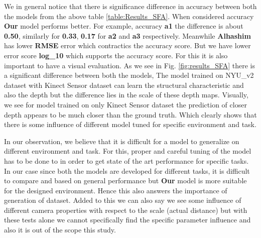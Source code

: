 We in general notice that there is significance difference in accuracy between both the models from the above table \ref{table:Results_SFA}. When considered accuracy \textbf{Our} model performs better. For example, accuracy \textbf{a1} the difference is about \textbf{0.50}, similarly for \textbf{0.33}, \textbf{0.17} for \textbf{a2} and \textbf{a3} respectively. Meanwhile \textbf{Alhashim} has lower \textbf{RMSE} error which contractics the accuracy score. But we have lower error score \textbf{log\_{10}} which supports the accuracy score. For this it is also important to have a visual evaluation. As we see in Fig. \ref{fig:results_SFA} there is a significant difference between both the models, The model trained on NYU\_v2 dataset with Kinect Sensor dataset can learn the structural characteristic and also the depth but the difference lies in the scale of these depth maps. Visually, we see for model trained on only Kinect Sensor dataset the prediction of closer depth appears to be much closer than the ground truth. Which clearly shows that there is some influence of different model tuned for specific environment and task.

In our observation, we believe that it is difficult for a model to generalize on different environment and task. For this, proper and careful tuning of the model has to be done to in order to get state of the art performance for specific tasks. In our case since both the models are developed for different tasks, it is difficult to compare and based on general performance but \textbf{Our} model is more suitable for the designed environment. Hence this also answers the importance of generation of dataset. Added to this we can also say we see some influence of different camera properties with respect to the scale (actual distance) but with these tests alone we cannot specifically find the specific parameter influence and also it is out of the scope this study. 



